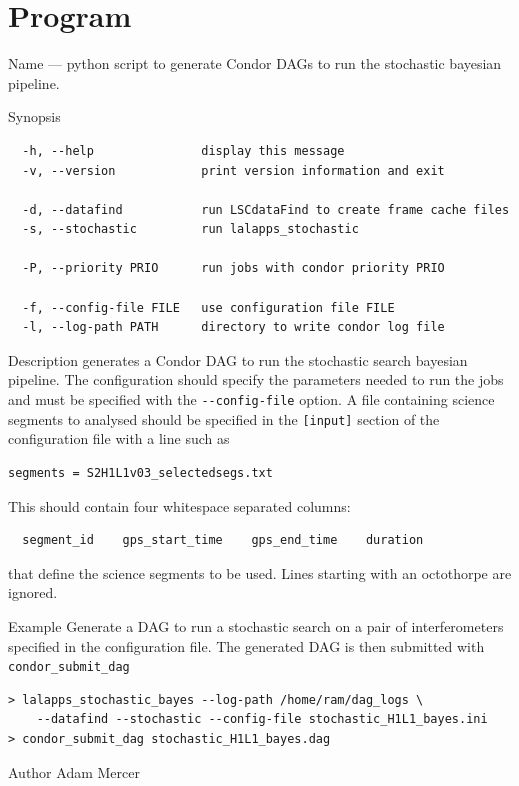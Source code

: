 \clearpage
\section{Program }
\label{program:lalapps-stochastic-bayes}

\begin{entry}
\item[Name]
 --- python script to generate Condor DAGs
to run the stochastic bayesian pipeline.

\item[Synopsis]
\begin{verbatim}
  -h, --help               display this message
  -v, --version            print version information and exit

  -d, --datafind           run LSCdataFind to create frame cache files
  -s, --stochastic         run lalapps_stochastic

  -P, --priority PRIO      run jobs with condor priority PRIO

  -f, --config-file FILE   use configuration file FILE
  -l, --log-path PATH      directory to write condor log file
\end{verbatim}

\item[Description]  generates a Condor
DAG to run the stochastic search bayesian pipeline. The configuration
should specify the parameters needed to run the jobs and must be
specified with the \verb$--config-file$ option. A file containing
science segments to analysed should be specified in the \verb$[input]$
section of the configuration file with a line such as

\begin{verbatim}
segments = S2H1L1v03_selectedsegs.txt
\end{verbatim}

This should contain
four whitespace separated columns:

\begin{verbatim}
  segment_id    gps_start_time    gps_end_time    duration
\end{verbatim}

that define the science segments to be used. Lines starting with an
octothorpe are ignored.

\item[Example]
Generate a DAG to run a stochastic search on a pair of interferometers
specified in the configuration file. The generated DAG is then submitted
with \texttt{condor\_submit\_dag}

\begin{verbatim}
> lalapps_stochastic_bayes --log-path /home/ram/dag_logs \
    --datafind --stochastic --config-file stochastic_H1L1_bayes.ini
> condor_submit_dag stochastic_H1L1_bayes.dag
\end{verbatim}

\item[Author]
Adam Mercer
\end{entry}

